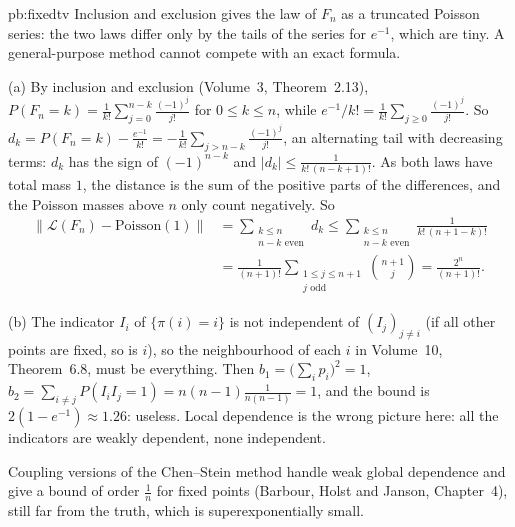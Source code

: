 \begin{solution}{pb:fixedtv}
\idea Inclusion and exclusion gives the law of $F_n$ as a truncated Poisson series: the two laws differ only by the tails of the series for $e^{-1}$, which are tiny. A
general-purpose method cannot compete with an exact formula.

\writeup (a) By inclusion and exclusion (Volume~3, Theorem~2.13), $P(F_n=k)=\frac1{k!}\sum_{j=0}^{n-k}\frac{(-1)^j}{j!}$ for $0\le k\le n$, while $e^{-1}/k!=\frac1{k!}\sum_{j\ge0}\frac{(-1)^j}{j!}$.
So $d_k=P(F_n=k)-\frac{e^{-1}}{k!}=-\frac1{k!}\sum_{j>n-k}\frac{(-1)^j}{j!}$, an alternating tail with decreasing terms: $d_k$ has the sign of $(-1)^{n-k}$ and
$|d_k|\le\frac1{k!\,(n-k+1)!}$. As both laws have total mass $1$, the distance is the sum of the positive parts of the differences, and the Poisson masses above $n$ only
count negatively. So
\[
\begin{aligned}
\|\mathcal L(F_n)-\text{Poisson}(1)\|&=\sum_{\substack{k\le n\\ n-k\text{ even}}}d_k\le\sum_{\substack{k\le n\\ n-k\text{ even}}}\frac1{k!\,(n+1-k)!}\\
&=\frac1{(n+1)!}\sum_{\substack{1\le j\le n+1\\ j\text{ odd}}}\binom{n+1}j=\frac{2^n}{(n+1)!}.
\end{aligned}
\]

(b) The indicator $I_i$ of $\{\pi(i)=i\}$ is not independent of $(I_j)_{j\ne i}$ (if all other points are fixed, so is $i$), so the neighbourhood of each $i$ in Volume~10,
Theorem~6.8, must be everything. Then $b_1=\bigl(\sum_ip_i\bigr)^2=1$, $b_2=\sum_{i\ne j}P(I_iI_j=1)=n(n-1)\frac1{n(n-1)}=1$, and the bound is $2(1-e^{-1})\approx1.26$:
useless. Local dependence is the wrong picture here: all the indicators are weakly dependent, none independent.

\leads Coupling versions of the Chen--Stein method handle weak global dependence and give a bound of order $\frac1n$ for fixed points (Barbour, Holst and
Janson, Chapter~4), still far from the truth, which is superexponentially small.
\end{solution}


